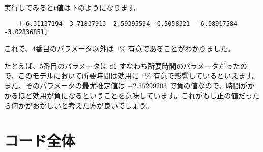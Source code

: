     実行してみるとt値は下のようになります。

    \begin{lstlisting}
    [ 6.31137194  3.71837913  2.59395594 -0.5058321  -6.08917584 -3.02836851]
\end{lstlisting}

    これで、4番目のパラメータ以外は $1\%$ 有意であることがわかりました。

    たとえば、5番目のパラメータは \lstinline{d1} すなわち所要時間のパラメータだったので、このモデルにおいて所要時間は効用に $1\%$ 有意で影響しているといえます。また、そのパラメータの最尤推定値は $-2.35299203$ で負の値なので、時間がかかるほど効用が負になるということを意味しています。これがもし正の値だったら何かがおかしいと考えた方が良いでしょう。

\section{ コード全体}


